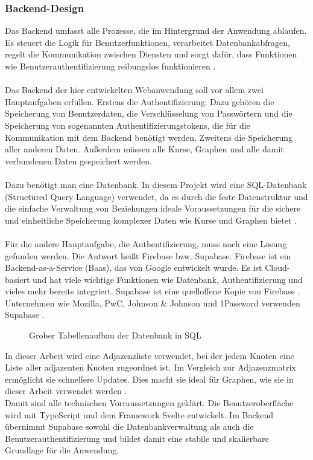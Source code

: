 \subsubsection{Backend-Design}
Das Backend umfasst alle Prozesse, die im Hintergrund der Anwendung ablaufen. Es steuert die Logik für Benutzerfunktionen, verarbeitet Datenbankabfragen, regelt die Kommunikation zwischen Diensten und sorgt dafür, dass Funktionen wie Benutzerauthentifizierung reibungslos funktionieren \parencite{nam-le-thanh-web-designer-2023}.\\\\
Das Backend der hier entwickelten Webanwendung soll vor allem zwei Hauptaufgaben erfüllen. Erstens die Authentifizierung: Dazu gehören die Speicherung von Benutzerdaten, die Verschlüsselung von Passwörtern und die Speicherung von sogenannten Authentifizierungstokens, die für die Kommunikation mit dem Backend benötigt werden. Zweitens die Speicherung aller anderen Daten. Außerdem müssen alle Kurse, Graphen und alle damit verbundenen Daten gespeichert werden.\\\\
Dazu benötigt man eine Datenbank. In diesem Projekt wird eine SQL-Datenbank (Structured Query Language) verwendet, da es durch die feste Datenstruktur und die einfache Verwaltung von Beziehungen ideale Voraussetzungen für die sichere und einheitliche Speicherung komplexer Daten wie Kurse und Graphen bietet \parencite{aws-sql}.\\\\
Für die andere Hauptaufgabe, die Authentifizierung, muss noch eine Lösung gefunden werden. Die Antwort heißt Firebase \acrshort{bzw.} Supabase. Firebase ist ein Backend-as-a-Service (Baas), das von Google entwickelt wurde. Es ist Cloud-basiert und hat viele wichtige Funktionen wie Datenbank, Authentifizierung und vieles mehr bereits integriert. Supabase ist eine quelloffene Kopie von Firebase \parencite{wilson-2022}. Unternehmen wie Mozilla, PwC, Johnson \& Johnson und 1Password verwenden Supabase \parencite{sb-companies}.
\begin{figure}[H]
    \centering
    \scalebox{0.5}{}
    \caption[Grober Tabellenaufbau in SQL]{Grober Tabellenaufbau der Datenbank in SQL}
\end{figure}

\noindent In dieser Arbeit wird eine Adjazenzliste verwendet, bei der jedem Knoten eine Liste aller adjazenten Knoten zugeordnet ist. Im Vergleich zur Adjazenzmatrix  ermöglicht sie schnellere Updates. Dies macht sie ideal für Graphen, wie sie in dieser Arbeit verwendet werden \parencite{geeksforgeeks-2021}.\\
Damit sind alle technischen Vorraussetzungen geklärt. Die Benutzeroberfläche wird mit TypeScript und dem Framework Svelte entwickelt. Im Backend übernimmt Supabase sowohl die Datenbankverwaltung als auch die Benutzerauthentifizierung und bildet damit eine stabile und skalierbare Grundlage für die Anwendung.
\newpage
